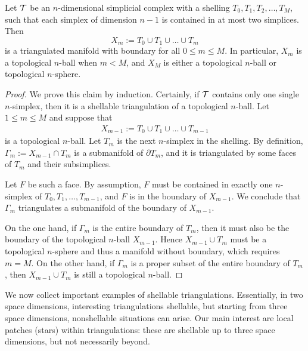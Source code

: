 \documentclass[10pt,letterpaper]{article}
\begin{document}
\begin{lemma}\label{lemma:shell_triang_man}
    Let ${\mathcal T}$ be an $n$-dimensional simplicial complex 
    with a shelling $T_{0}, T_{1}, T_{2}, \dots, T_{M}$,
    such that each simplex of dimension $n-1$ is contained in at most two simplices. 
    Then
    $$
        X_{m} := T_{0} \cup T_{1} \cup \dots \cup T_{m}
    $$ 
    is a triangulated manifold with boundary for all $0 \leq m \leq M$.
    In particular, $X_{m}$ is a topological $n$-ball when $m < M$, 
    and 
    $X_{M}$ is either a topological $n$-ball or topological $n$-sphere. 
\end{lemma}
\begin{proof}  
    We prove this claim by induction. 
    Certainly, if ${\mathcal T}$ contains only one single $n$-simplex, then it is a shellable triangulation of a topological $n$-ball. Let $1 \leq m \leq M$ and suppose that 
    \begin{align*}
        X_{m-1} := T_{0} \cup T_{1} \cup \dots \cup T_{m-1}
    \end{align*}
    is a topological $n$-ball. Let $T_{m}$ is the next $n$-simplex in the shelling.
    By definition, $\Gamma_{m} := X_{m-1} \cap T_{m}$ is a submanifold of $\partial T_{m}$,
    and it is triangulated by some faces of $T_{m}$ and their subsimplices. 
    
    Let $F$ be such a face. 
    By assumption, $F$ must be contained in exactly one $n$-simplex of $T_{0}, T_{1}, \dots, T_{m-1}$,
    and $F$ is in the boundary of $X_{m-1}$. 
    We conclude that $\Gamma_{m}$ triangulates a submanifold of the boundary of $X_{m-1}$.
    
    On the one hand, 
    if $\Gamma_{m}$ is the entire boundary of $T_{m}$, 
    then it must also be the boundary of the topological $n$-ball $X_{m-1}$. 
    Hence $X_{m-1} \cup T_{m}$ must be a topological $n$-sphere and thus a manifold without boundary, 
    which requires $m = M$.
    On the other hand, 
    if $\Gamma_{m}$ is a proper subset of the entire boundary of $T_{m}$, 
    then $X_{m-1} \cup T_{m}$ is still a topological $n$-ball.
\end{proof}


We now collect important examples of shellable triangulations. Essentially, in two space dimensions, interesting triangulations shellable, but starting from three space dimensions, nonshellable situations can arise. Our main interest are local patches (stars) within triangulations: these are shellable up to three space dimensions, but not necessarily beyond. 
\end{document}
